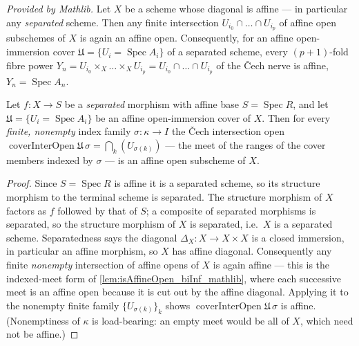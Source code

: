 \begin{lemma}
  \label{lem:isAffineOpen_biInf_mathlib}
  \mathlibok
  \textit{Provided by Mathlib.}
  Let \(X\) be a scheme whose diagonal is affine --- in particular any \emph{separated}
  scheme. Then any finite
  intersection \(U_{i_0} \cap \dots \cap U_{i_p}\) of affine open subschemes of \(X\) is
  again an affine open. Consequently, for an affine open-immersion cover
  \(\mathfrak{U} = \{U_i = \operatorname{Spec} A_i\}\) of a separated scheme, every
  \((p+1)\)-fold fibre power \(Y_n = U_{i_0} \times_X \dots \times_X U_{i_p} =
  U_{i_0} \cap \dots \cap U_{i_p}\) of the {\v C}ech nerve is affine,
  \(Y_n = \operatorname{Spec} A_n\).
\end{lemma}

\begin{lemma}\leanok
  \label{lem:cech_interopen_isaffine}
  Let \(f : X \to S\) be a \emph{separated} morphism with affine base
  \(S = \operatorname{Spec} R\), and let \(\mathfrak{U} = \{U_i = \operatorname{Spec} A_i\}\)
  be an affine open-immersion cover of \(X\). Then for every \emph{finite, nonempty} index
  family \(\sigma : \kappa \to I\) the {\v C}ech intersection open
  \(\operatorname{coverInterOpen}\mathfrak{U}\,\sigma = \bigcap_k (U_{\sigma(k)})\) --- the
  meet of the ranges of the cover members indexed by \(\sigma\) --- is an affine open
  subscheme of \(X\).
\end{lemma}
\begin{proof}
  Since \(S = \operatorname{Spec} R\) is affine it is a separated scheme, so its structure
  morphism to the terminal scheme is separated. The structure morphism of \(X\) factors as
  \(f\) followed by that of \(S\); a composite of separated morphisms is separated, so the
  structure morphism of \(X\) is separated, i.e.\ \(X\) is a separated scheme. Separatedness
  says the diagonal \(\Delta_X : X \to X \times X\) is a closed immersion, in particular an
  affine morphism, so \(X\) has affine diagonal. Consequently any finite \emph{nonempty}
  intersection of affine opens of \(X\) is again affine --- this is the indexed-meet form of
  \cref{lem:isAffineOpen_biInf_mathlib}, where each successive meet is an affine open because
  it is cut out by the affine diagonal. Applying it to the nonempty finite family
  \(\{U_{\sigma(k)}\}_k\) shows \(\operatorname{coverInterOpen}\mathfrak{U}\,\sigma\) is
  affine. (Nonemptiness of \(\kappa\) is load-bearing: an empty meet would be all of \(X\),
  which need not be affine.)
\end{proof}

